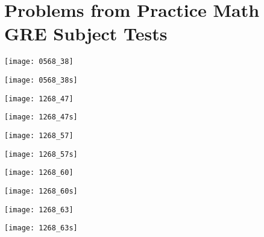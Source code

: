 %
%
%
%
%
%
%
%


\section{Problems from Practice Math GRE Subject Tests}

%

\texttt{[image: 0568\_38]}

\texttt{[image: 0568\_38s]}

\texttt{[image: 1268\_47]}

\texttt{[image: 1268\_47s]}

\texttt{[image: 1268\_57]}

\texttt{[image: 1268\_57s]}

\texttt{[image: 1268\_60]}

\texttt{[image: 1268\_60s]}

\texttt{[image: 1268\_63]}

\texttt{[image: 1268\_63s]}

%
%
%
%